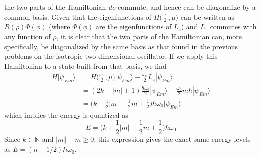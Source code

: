 \documentclass[../principles-of-quantum-mechanics.tex]{subfiles}
\begin{document}
\begin{questions}
\begin{solution}
		the two parts of the Hamiltonian \textit{do} commute, and hence can be diagonalize by a common basis. Given that the eigenfunctions of $H\big(\frac{\omega_0}{2}, \mu\big)$ can be written as $R(\rho)\Phi(\phi)$ (where $\Phi(\phi)$ are the eigenfunctions of $L_z$) and $L_z$ commutes with any function of $\rho$, it is clear that the two parts of the Hamiltonian can, more specifically, be diagonalized by the same basis as that found in the previous problems on the isotropic two-dimensional oscillator. If we apply this Hamiltonian to a state built from that basis, we find
		\begin{align*} 
			H|\psi_{Em}\rangle &= H\Big(\frac{\omega_0}{2}, \mu\Big)|\psi_{Em}\rangle - \frac{\omega_0}{2}L_z|\psi_{Em}\rangle \\
			&= (2k + |m| + 1)\frac{\hbar\omega_0}{2}|\psi_{Em}\rangle - \frac{\omega_0}{2}m\hbar|\psi_{Em}\rangle \\
			&= \Big(k + \frac{1}{2}|m| - \frac{1}{2}m + \frac{1}{2}\Big)\hbar\omega_0|\psi_{Em}\rangle
		\end{align*}
		which implies the energy is quantized as
		$$E = \Big(k + \frac{1}{2}|m| - \frac{1}{2}m + \frac{1}{2}\Big)\hbar\omega_0$$
		Since $k \in \mathbb{N}$ and $|m| - m \geq 0$, this expression gives the exact same energy levels as $E = (n + 1/2)\hbar\omega_0$.
	\end{solution}
	\end{questions}
\end{document}
